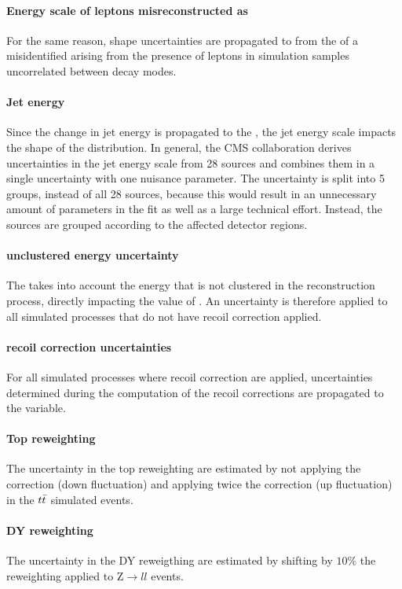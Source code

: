\paragraph{Energy scale of leptons misreconstructed as \tauh} For the same reason, shape uncertainties are propagated to \mttot from the \pt of a misidentified \tauh arising from the presence of leptons in simulation samples uncorrelated between decay modes.


\paragraph{Jet energy} Since the change in jet energy is propagated to the \MET, the jet energy scale impacts the shape of the \mttot distribution. In general, the CMS collaboration derives uncertainties in the jet energy scale from 28 sources and combines them in a single uncertainty with one nuisance parameter. The uncertainty is split into 5 groups, instead of all 28 sources, because this would result in an unnecessary amount of parameters in the fit as well as a large technical effort. Instead, the sources are grouped according to the affected detector regions.

\paragraph{\MET unclustered energy uncertainty} The \MET takes into account the energy that is not clustered in the reconstruction process, directly impacting the value of \mttot. An uncertainty is therefore applied to all simulated processes that do not have recoil correction applied.

\paragraph{\MET recoil correction uncertainties} For all simulated processes where recoil correction are applied, uncertainties determined during the computation of the recoil corrections are propagated to the \mtot variable.

\paragraph{Top \pt reweighting} The uncertainty in the top \pt reweighting are estimated by not applying the correction (down fluctuation) and applying twice the correction (up fluctuation) in the $t\Bar{t}$ simulated events.

\paragraph{DY \pt reweighting} The uncertainty in the DY \pt reweigthing are estimated by shifting by $10\%$ the reweighting applied to $\mathrm{Z}\rightarrow ll$ events.

